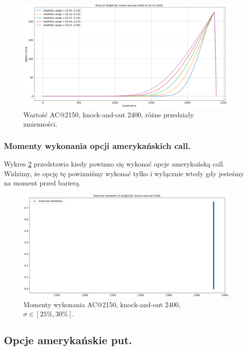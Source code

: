 \documentclass[12pt]{article}
\begin{document}
\begin{figure}[H]
    \centering
    \includegraphics[width=\textwidth,height=\textheight,keepaspectratio]{ac_2150_2400_diff_vol_ex.png}
    \caption{Wartość AC@2150, knock-and-out 2400, różne przedziały zmienności.}
    \label{fig:ac_2150_2400_diff_vol_ex}
\end{figure}

\subsubsection{Momenty wykonania opcji amerykańskich call.}

Wykres \ref{fig:em_ac_2150_2400} przedstawia kiedy powinno się wykonać opcje amerykańską call. Widzimy, że opcję tę powinniśmy wykonać tylko i wyłącznie wtedy gdy jesteśmy na moment przed barierą. 

\begin{figure}[H]
    \centering
    \includegraphics[width=\textwidth,height=\textheight,keepaspectratio]{em_ac_2150_2400.png}
    \caption{Momenty wykonania AC@2150, knock-and-out 2400, $\sigma \in [25\%, 30\%].$}
    \label{fig:em_ac_2150_2400}
\end{figure}

\subsection{Opcje amerykańskie put.}
\end{document}
